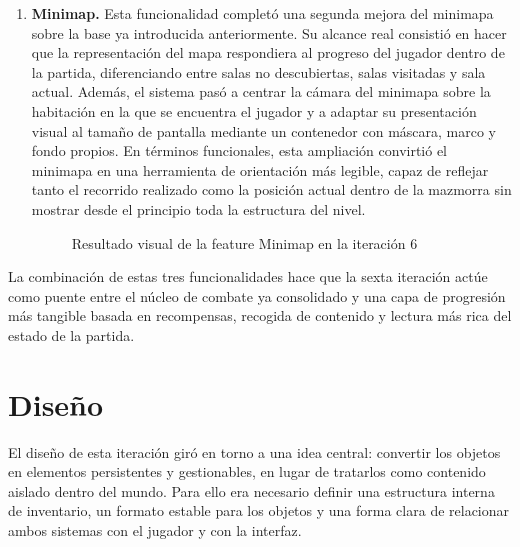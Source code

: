 \begin{enumerate}
\begin{figure}[H]
\begin{center}
\caption{Resultado visual de la feature Objetos en la iteración 6}
\label{fig:iteracion6-feature-objetos}
\end{center}
\end{figure}

\item \textbf{Minimap.} Esta funcionalidad completó una segunda mejora del minimapa sobre la
base ya introducida anteriormente. Su alcance real consistió en hacer que la representación
del mapa respondiera al progreso del jugador dentro de la partida, diferenciando entre salas
no descubiertas, salas visitadas y sala actual. Además, el sistema pasó a centrar la cámara
del minimapa sobre la habitación en la que se encuentra el jugador y a adaptar su
presentación visual al tamaño de pantalla mediante un contenedor con máscara, marco y fondo
propios. En términos funcionales, esta ampliación convirtió el minimapa en una herramienta
de orientación más legible, capaz de reflejar tanto el recorrido realizado como la posición
actual dentro de la mazmorra sin mostrar desde el principio toda la estructura del nivel.

\begin{figure}[H]
\begin{center}
\caption{Resultado visual de la feature Minimap en la iteración 6}
\label{fig:iteracion6-feature-minimap}
\end{center}
\end{figure}
\end{enumerate}

La combinación de estas tres funcionalidades hace que la sexta iteración actúe como puente
entre el núcleo de combate ya consolidado y una capa de progresión más tangible basada en
recompensas, recogida de contenido y lectura más rica del estado de la partida.

\section{Diseño}
El diseño de esta iteración giró en torno a una idea central: convertir los objetos en
elementos persistentes y gestionables, en lugar de tratarlos como contenido aislado dentro
del mundo. Para ello era necesario definir una estructura interna de inventario, un formato
estable para los objetos y una forma clara de relacionar ambos sistemas con el jugador y con
la interfaz.

